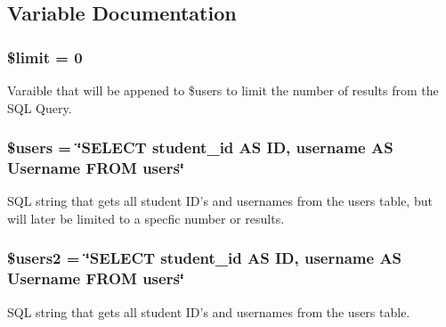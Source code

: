 \subsection{\-Variable \-Documentation}
\hypertarget{mUser_8php_ae05862a0294251c88629b141b5ce329a}{
\subsubsection[{\$limit}]{\setlength{\rightskip}{0pt plus 5cm}\$limit = 0}}\label{mUser_8php_ae05862a0294251c88629b141b5ce329a}
\-Varaible that will be appened to \$users to limit the number of results from the \-S\-Q\-L \-Query. \hypertarget{mUser_8php_a28005d22fa7ef2dfe215ad886b497d9c}{
\subsubsection[{\$users}]{\setlength{\rightskip}{0pt plus 5cm}\$users = \char`\"{}\-S\-E\-L\-E\-C\-T student\-\_\-id \-A\-S \-I\-D, username \-A\-S \-Username \-F\-R\-O\-M users\char`\"{}}}\label{mUser_8php_a28005d22fa7ef2dfe215ad886b497d9c}
\-S\-Q\-L string that gets all student \-I\-D's and usernames from the users table, but will later be limited to a specfic number or results. \hypertarget{mUser_8php_a62dd122dbddde32a07c3f104eabb051f}{
\subsubsection[{\$users2}]{\setlength{\rightskip}{0pt plus 5cm}\$users2 = \char`\"{}\-S\-E\-L\-E\-C\-T student\-\_\-id \-A\-S \-I\-D, username \-A\-S \-Username \-F\-R\-O\-M users\char`\"{}}}\label{mUser_8php_a62dd122dbddde32a07c3f104eabb051f}
\-S\-Q\-L string that gets all student \-I\-D's and usernames from the users table. 